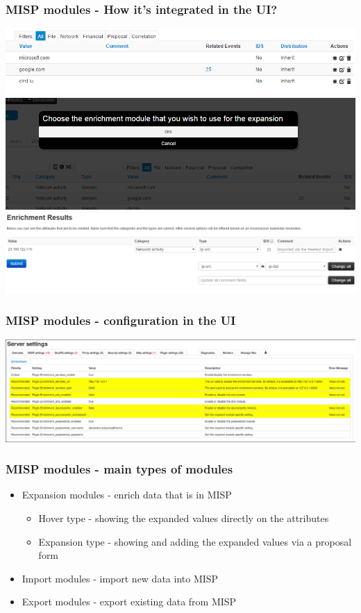 \begin{frame}
        \frametitle{MISP modules - How it's integrated in the UI?}
        \includegraphics[scale=0.40]{screenshots/enrichment1.PNG}\\
        \includegraphics[scale=0.38]{screenshots/enrichment2.PNG}\\
        \includegraphics[scale=0.35]{screenshots/enrichment3.PNG}
\end{frame}

\begin{frame}
        \frametitle{MISP modules - configuration in the UI}
        \includegraphics[scale=0.50]{modules-integration.png}
\end{frame}

\begin{frame}
        \frametitle{MISP modules - main types of modules}
        \begin{itemize}
            \item Expansion modules - enrich data that is in MISP
                    \begin{itemize}
                        \item Hover type - showing the expanded values directly on the attributes
                        \item Expansion type - showing and adding the expanded values via a proposal form
                    \end{itemize}
            \item Import modules - import new data into MISP
            \item Export modules - export existing data from MISP
        \end{itemize}
\end{frame}


